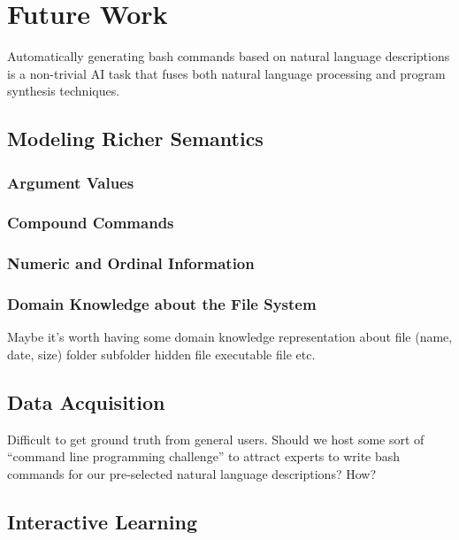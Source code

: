 \section{Future Work}

Automatically generating bash commands based on natural language descriptions is a non-trivial AI task that fuses both natural language processing and program synthesis techniques. 

\subsection{Modeling Richer Semantics}
\label{future:semantics}
\subsubsection{Argument Values}

\subsubsection{Compound Commands}

\subsubsection{Numeric and Ordinal Information}

\subsubsection{Domain Knowledge about the File System}

Maybe it's worth having some domain knowledge representation about 
file (name, date, size)
folder
subfolder
hidden file 
executable file
etc.

\subsection{Data Acquisition}

Difficult to get ground truth from general users. Should we host some sort of ``command line programming challenge'' to attract experts to write bash commands for our pre-selected natural language descriptions? How?

\subsection{Interactive Learning}